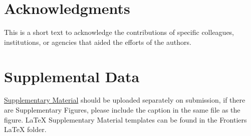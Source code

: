 \documentclass[utf8]{style/FrontiersinHarvard}
\begin{document}
\section*{Acknowledgments}
This is a short text to acknowledge the contributions of specific colleagues, institutions, or agencies that aided the efforts of the authors.

\section*{Supplemental Data}
 \href{http://home.frontiersin.org/about/author-guidelines#SupplementaryMaterial}{Supplementary Material} should be uploaded separately on submission, if there are Supplementary Figures, please include the caption in the same file as the figure. LaTeX Supplementary Material templates can be found in the Frontiers LaTeX folder.



\end{document}
